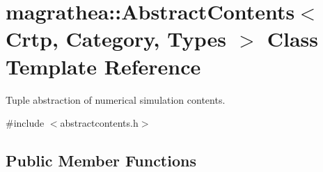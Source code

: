 \hypertarget{classmagrathea_1_1AbstractContents}{\section{magrathea\-:\-:Abstract\-Contents$<$ Crtp, Category, Types $>$ Class Template Reference}
\label{classmagrathea_1_1AbstractContents}
}


Tuple abstraction of numerical simulation contents.  




{\ttfamily \#include $<$abstractcontents.\-h$>$}

\subsection*{Public Member Functions}
